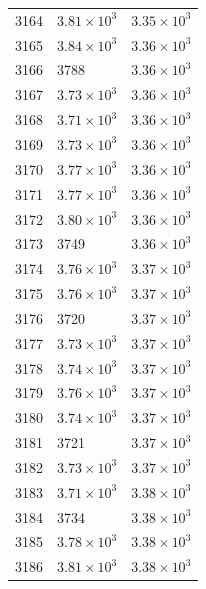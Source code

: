 \begin{table}[H]
\begin{tabular}{lll}
3164 & $\displaystyle 3.81 \times 10^{3}$ & $\displaystyle 3.35 \times 10^{3}$ \\
3165 & $\displaystyle 3.84 \times 10^{3}$ & $\displaystyle 3.36 \times 10^{3}$ \\
3166 & 3788 & $\displaystyle 3.36 \times 10^{3}$ \\
3167 & $\displaystyle 3.73 \times 10^{3}$ & $\displaystyle 3.36 \times 10^{3}$ \\
3168 & $\displaystyle 3.71 \times 10^{3}$ & $\displaystyle 3.36 \times 10^{3}$ \\
3169 & $\displaystyle 3.73 \times 10^{3}$ & $\displaystyle 3.36 \times 10^{3}$ \\
3170 & $\displaystyle 3.77 \times 10^{3}$ & $\displaystyle 3.36 \times 10^{3}$ \\
3171 & $\displaystyle 3.77 \times 10^{3}$ & $\displaystyle 3.36 \times 10^{3}$ \\
3172 & $\displaystyle 3.80 \times 10^{3}$ & $\displaystyle 3.36 \times 10^{3}$ \\
3173 & 3749 & $\displaystyle 3.36 \times 10^{3}$ \\
3174 & $\displaystyle 3.76 \times 10^{3}$ & $\displaystyle 3.37 \times 10^{3}$ \\
3175 & $\displaystyle 3.76 \times 10^{3}$ & $\displaystyle 3.37 \times 10^{3}$ \\
3176 & 3720 & $\displaystyle 3.37 \times 10^{3}$ \\
3177 & $\displaystyle 3.73 \times 10^{3}$ & $\displaystyle 3.37 \times 10^{3}$ \\
3178 & $\displaystyle 3.74 \times 10^{3}$ & $\displaystyle 3.37 \times 10^{3}$ \\
3179 & $\displaystyle 3.76 \times 10^{3}$ & $\displaystyle 3.37 \times 10^{3}$ \\
3180 & $\displaystyle 3.74 \times 10^{3}$ & $\displaystyle 3.37 \times 10^{3}$ \\
3181 & 3721 & $\displaystyle 3.37 \times 10^{3}$ \\
3182 & $\displaystyle 3.73 \times 10^{3}$ & $\displaystyle 3.37 \times 10^{3}$ \\
3183 & $\displaystyle 3.71 \times 10^{3}$ & $\displaystyle 3.38 \times 10^{3}$ \\
3184 & 3734 & $\displaystyle 3.38 \times 10^{3}$ \\
3185 & $\displaystyle 3.78 \times 10^{3}$ & $\displaystyle 3.38 \times 10^{3}$ \\
3186 & $\displaystyle 3.81 \times 10^{3}$ & $\displaystyle 3.38 \times 10^{3}$ \\

\end{tabular}
\end{table}
